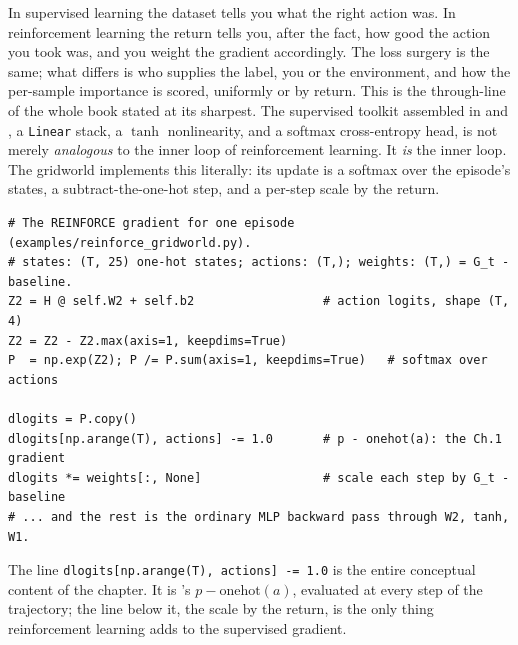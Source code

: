 In supervised learning the dataset tells you what the right action was. In
reinforcement learning the return tells you, after the fact, how good the
action you took was, and you weight the gradient accordingly. The loss surgery
is the same; what differs is who supplies the label, you or the environment,
and how the per-sample importance is scored, uniformly or by return. This is
the through-line of the whole book stated at its sharpest. The supervised
toolkit assembled in  and , a
\texttt{Linear} stack, a $\tanh$ nonlinearity, and a softmax cross-entropy
head, is not merely \emph{analogous} to the inner loop of reinforcement
learning. It \emph{is} the inner loop. The gridworld implements this literally:
its update is a softmax over the episode's states, a subtract-the-one-hot
step, and a per-step scale by the return.

\begin{lstlisting}
# The REINFORCE gradient for one episode (examples/reinforce_gridworld.py).
# states: (T, 25) one-hot states; actions: (T,); weights: (T,) = G_t - baseline.
Z2 = H @ self.W2 + self.b2                  # action logits, shape (T, 4)
Z2 = Z2 - Z2.max(axis=1, keepdims=True)
P  = np.exp(Z2); P /= P.sum(axis=1, keepdims=True)   # softmax over actions

dlogits = P.copy()
dlogits[np.arange(T), actions] -= 1.0       # p - onehot(a): the Ch.1 gradient
dlogits *= weights[:, None]                 # scale each step by G_t - baseline
# ... and the rest is the ordinary MLP backward pass through W2, tanh, W1.
\end{lstlisting}

The line \texttt{dlogits[np.arange(T), actions] -= 1.0} is the entire
conceptual content of the chapter. It is 's $p -
\mathrm{onehot}(a)$, evaluated at every step of the trajectory; the line below
it, the scale by the return, is the only thing reinforcement learning adds to
the supervised gradient.
